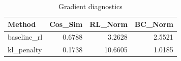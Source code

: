 \begin{table}[htbp]
\centering
\caption{Gradient diagnostics}
\label{tab:grad-diag}
\begin{tabular}{lrrr}
\toprule
\textbf{Method} & \textbf{Cos\_Sim} & \textbf{RL\_Norm} & \textbf{BC\_Norm} \\
\midrule
baseline\_rl & 0.6788 & 3.2628 & 2.5521 \\
kl\_penalty & 0.1738 & 10.6605 & 1.0185 \\
\bottomrule
\end{tabular}
\end{table}